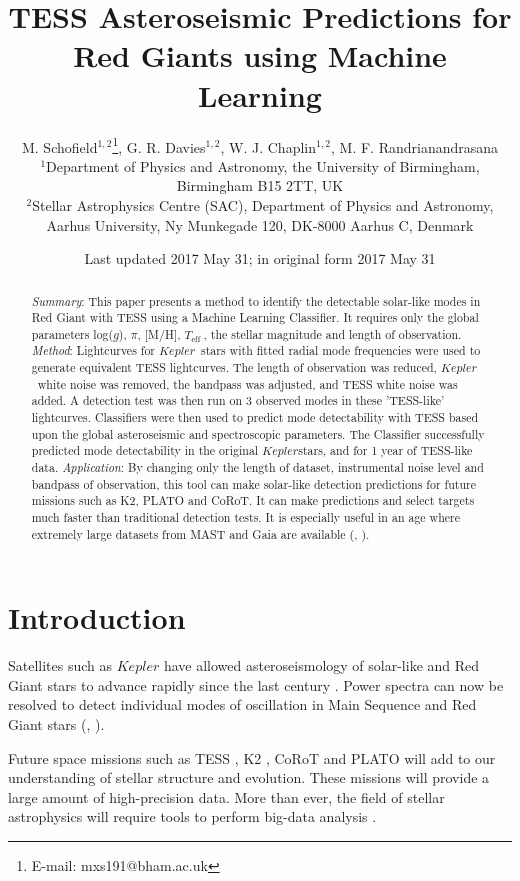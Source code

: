 \documentclass[a4paper,fleqn,usenatbib,useAMS]{mnras}
\title[TRG]{TESS Asteroseismic Predictions for Red Giants using Machine Learning}
\author[M. Schofield et al.]{M. Schofield$^{1, 2}$\thanks{E-mail: mxs191@bham.ac.uk}, G. R. Davies$^{1, 2}$, W. J. Chaplin$^{1, 2}$, M. F. Randrianandrasana
\\
$^{1}$Department of Physics and Astronomy, the University of Birmingham, Birmingham B15 2TT, UK \\
$^{2}$Stellar Astrophysics Centre (SAC), Department of Physics and Astronomy, Aarhus University, Ny Munkegade 120, DK-8000 Aarhus C, Denmark}
\date{Last updated 2017 May 31; in original form 2017 May 31}
\newcommand{\teff}{\ensuremath{T_{\textrm{eff}}\:}}
\newcommand{\kep}{\ensuremath{Kepler}\:}
\begin{document}
\label{firstpage}
\pagerange{\pageref{firstpage}--\pageref{lastpage}}
\maketitle

\begin{abstract}
{\it Summary}: This paper presents a method to identify the detectable solar-like modes in Red Giant with TESS using a Machine Learning Classifier. It requires only the global parameters log($g$), $\pi$, [M/H], \teff, the stellar magnitude and length of observation. \newline
{\it Method}: Lightcurves for \kep \ stars with fitted radial mode frequencies were used to generate equivalent TESS lightcurves. The length of observation was reduced, \kep \ white noise was removed, the bandpass was adjusted, and TESS white noise was added. A detection test was then run on 3 observed modes in these 'TESS-like' lightcurves. Classifiers were then used to predict mode detectability with TESS based upon the global asteroseismic and spectroscopic parameters. The Classifier successfully predicted mode detectability in the original \kep stars, and for 1 year of TESS-like data.\newline
{\it Application}: By changing only the length of dataset, instrumental noise level and bandpass of observation, this tool can make solar-like detection predictions for future missions such as K2, PLATO and CoRoT. It can make predictions and select targets much faster than traditional detection tests. It is especially useful in an age where extremely large datasets from MAST and Gaia are available (\citet{eisenstein_sdss-iii:_2011}, \citet{gaia_collaboration_gaia_2016}).
\end{abstract}



\section{Introduction}

Satellites such as $Kepler$ have allowed asteroseismology of solar-like and Red Giant stars to advance rapidly since the last century \citet{chaplin_asteroseismology_2013}. Power spectra can now be resolved to detect individual modes of oscillation in Main Sequence and Red Giant stars (\citet{lund_standing_2017}, \citet{davies_asteroseismology_2016}).

Future space missions such as TESS \citep{ricker_transiting_2014}, K2 \citep{howell_k2_2014}, CoRoT \citep{baglin_corot:_2006} and PLATO \citep{rauer_plato_2014} will add to our understanding of stellar structure and evolution. These missions will provide a large amount of high-precision data. More than ever, the field of stellar astrophysics will require tools to perform big-data analysis \citep{kremer_big_2017}. 
\end{document}
